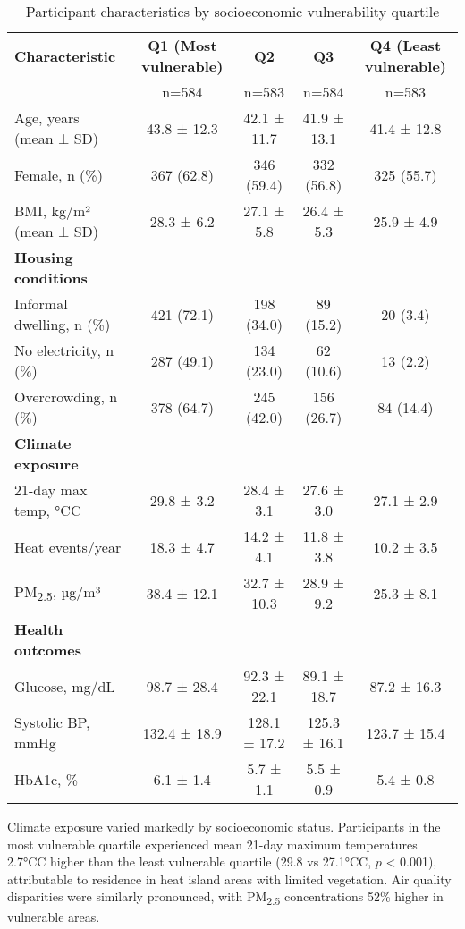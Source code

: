 \documentclass[11pt,a4paper]{article}
\newcommand{\degrees}{°C}
\begin{document}
\begin{table}[h!]
\centering
\caption{Participant characteristics by socioeconomic vulnerability quartile}
\begin{tabular}{lcccc}
\toprule
\textbf{Characteristic} & \textbf{Q1 (Most vulnerable)} & \textbf{Q2} & \textbf{Q3} & \textbf{Q4 (Least vulnerable)} \\
& n=584 & n=583 & n=584 & n=583 \\
\midrule
Age, years (mean ± SD) & 43.8 ± 12.3 & 42.1 ± 11.7 & 41.9 ± 13.1 & 41.4 ± 12.8 \\
Female, n (\%) & 367 (62.8) & 346 (59.4) & 332 (56.8) & 325 (55.7) \\
BMI, kg/m² (mean ± SD) & 28.3 ± 6.2 & 27.1 ± 5.8 & 26.4 ± 5.3 & 25.9 ± 4.9 \\
\midrule
\textbf{Housing conditions} & & & & \\
Informal dwelling, n (\%) & 421 (72.1) & 198 (34.0) & 89 (15.2) & 20 (3.4) \\
No electricity, n (\%) & 287 (49.1) & 134 (23.0) & 62 (10.6) & 13 (2.2) \\
Overcrowding, n (\%) & 378 (64.7) & 245 (42.0) & 156 (26.7) & 84 (14.4) \\
\midrule
\textbf{Climate exposure} & & & & \\
21-day max temp, \degrees C & 29.8 ± 3.2 & 28.4 ± 3.1 & 27.6 ± 3.0 & 27.1 ± 2.9 \\
Heat events/year & 18.3 ± 4.7 & 14.2 ± 4.1 & 11.8 ± 3.8 & 10.2 ± 3.5 \\
PM\textsubscript{2.5}, µg/m³ & 38.4 ± 12.1 & 32.7 ± 10.3 & 28.9 ± 9.2 & 25.3 ± 8.1 \\
\midrule
\textbf{Health outcomes} & & & & \\
Glucose, mg/dL & 98.7 ± 28.4 & 92.3 ± 22.1 & 89.1 ± 18.7 & 87.2 ± 16.3 \\
Systolic BP, mmHg & 132.4 ± 18.9 & 128.1 ± 17.2 & 125.3 ± 16.1 & 123.7 ± 15.4 \\
HbA1c, \% & 6.1 ± 1.4 & 5.7 ± 1.1 & 5.5 ± 0.9 & 5.4 ± 0.8 \\
\bottomrule
\end{tabular}
\end{table}

Climate exposure varied markedly by socioeconomic status. Participants in the most vulnerable quartile experienced mean 21-day maximum temperatures 2.7\degrees C higher than the least vulnerable quartile (29.8 vs 27.1\degrees C, $p$ < 0.001), attributable to residence in heat island areas with limited vegetation. Air quality disparities were similarly pronounced, with PM\textsubscript{2.5} concentrations 52\% higher in vulnerable areas.
\end{document}
